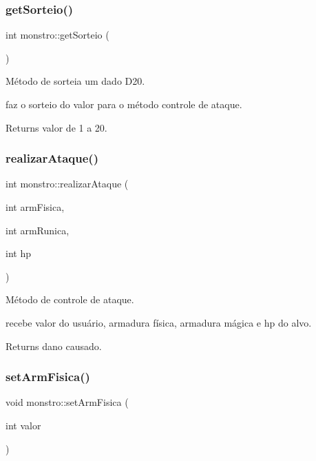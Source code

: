 \subsubsection{\texorpdfstring{get\+Sorteio()}{getSorteio()}}
{\footnotesize\ttfamily int monstro\+::get\+Sorteio (\begin{DoxyParamCaption}{ }\end{DoxyParamCaption})}



Método de sorteia um dado D20. 

faz o sorteio do valor para o método controle de ataque. \begin{DoxyReturn}{Returns}
valor de 1 a 20. 
\end{DoxyReturn}
\mbox{\label{classmonstro_a37425b0ce131bea83207142ef6b6c3bd}} 
\subsubsection{\texorpdfstring{realizar\+Ataque()}{realizarAtaque()}}
{\footnotesize\ttfamily int monstro\+::realizar\+Ataque (\begin{DoxyParamCaption}\item[{int}]{arm\+Fisica,  }\item[{int}]{arm\+Runica,  }\item[{int}]{hp }\end{DoxyParamCaption})}



Método de controle de ataque. 

recebe valor do usuário, armadura física, armadura mágica e hp do alvo. \begin{DoxyReturn}{Returns}
dano causado. 
\end{DoxyReturn}
\mbox{\label{classmonstro_a5935667552ab7ec9ccd94e4632ecb428}} 
\subsubsection{\texorpdfstring{set\+Arm\+Fisica()}{setArmFisica()}}
{\footnotesize\ttfamily void monstro\+::set\+Arm\+Fisica (\begin{DoxyParamCaption}\item[{int}]{valor }\end{DoxyParamCaption})}



